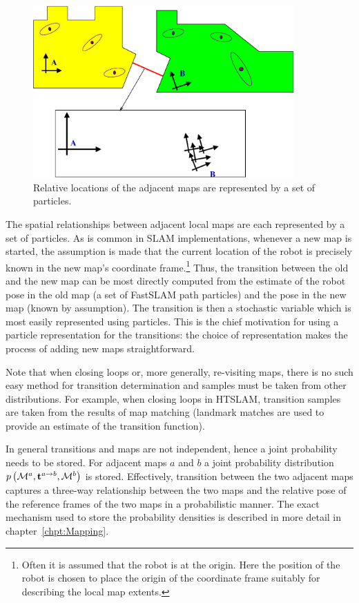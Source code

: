 \begin{figure}
\begin{center}
\includegraphics[width=10cm]{Pics/fig_transition_model}
\end{center}
\caption{Relative locations of the adjacent maps are represented by a
  set of particles.}
\end{figure}

The spatial relationships between adjacent local maps are each
represented by a set of particles.  As is common in SLAM
implementations, whenever a new map is started, the assumption is made
that the current location of the robot is precisely known in the new
map's coordinate frame.\footnote{Often it is assumed that the robot is
at the origin.  Here the position of the robot is chosen to place the
origin of the coordinate frame suitably for describing the local map
extents.} Thus, the transition between the old and the new map can be
most directly computed from the estimate of the robot pose in the old
map (a set of FastSLAM path particles) and the pose in the new map
(known by assumption). The transition is then a stochastic variable
which is most easily represented using particles. This is the chief
motivation for using a particle representation for the
transitions: the choice of representation makes the process of adding
new maps straightforward.

Note that when closing loops or, more generally, re-visiting maps,
there is no such easy method for transition determination and samples
must be taken from other distributions. For example, when closing
loops in HTSLAM, transition samples are taken from the results of map
matching (landmark matches are used to provide an estimate of
the transition function).

In general transitions and maps are not independent,
hence a joint probability needs to be stored. For adjacent maps $a$
and $b$ a joint probability distribution
$\prob{\map{}{}{a},\tr{}{a}{b}, \map{}{}{b}}$ is stored. Effectively,
transition between the two adjacent maps captures a three-way
relationship between the two maps and the relative pose of the
reference frames of the two maps in a probabilistic manner. The exact
mechanism used to store the probability densities is described in more
detail in chapter~\ref{chpt:Mapping}.


